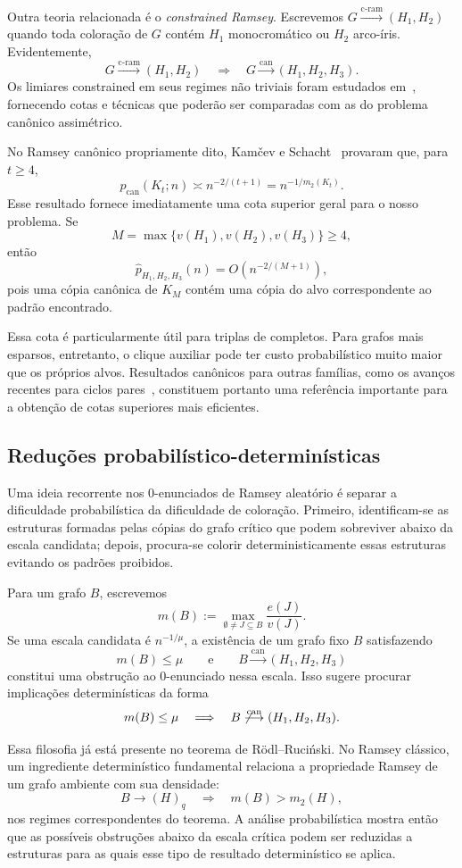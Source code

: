 \documentclass[11pt,a4paper]{article}
\newcommand{\can}{\stackrel{\mathrm{can}}{\longrightarrow}}
\newcommand{\cram}{\stackrel{\mathrm{c\text{-}ram}}{\longrightarrow}}
\theoremstyle{plain}
\theoremstyle{definition}
\begin{document}
Outra teoria relacionada é o \emph{constrained Ramsey}. Escrevemos
$G\cram(H_1,H_2)$
quando toda coloração de $G$ contém $H_1$ monocromático ou
$H_2$ arco-íris. Evidentemente,
\[
  G\cram(H_1,H_2)
  \quad\Longrightarrow\quad
  G\can(H_1,H_2,H_3).
\]
Os limiares constrained em seus regimes não triviais foram estudados
em~\cite{KKM,CKMM,BHHLM}, fornecendo cotas e técnicas que poderão ser
comparadas com as do problema canônico assimétrico.

No Ramsey canônico propriamente dito, Kamčev e Schacht~\cite{KS}
provaram que, para $t\ge4$,
\[
  p_{\mathrm{can}}(K_t;n)
  \asymp
  n^{-2/(t+1)}
  =
  n^{-1/m_2(K_t)}.
\]
Esse resultado fornece imediatamente uma cota superior geral para o
nosso problema. Se
\[
  M=\max\{v(H_1),v(H_2),v(H_3)\}\ge4,
\]
então
\[
  \widehat p_{H_1,H_2,H_3}(n)
  =
  O\!\left(n^{-2/(M+1)}\right),
\]
pois uma cópia canônica de $K_M$ contém uma cópia do alvo
correspondente ao padrão encontrado.

Essa cota é particularmente útil para triplas de completos. Para
grafos mais esparsos, entretanto, o clique auxiliar pode ter custo
probabilístico muito maior que os próprios alvos. Resultados canônicos
para outras famílias, como os avanços recentes para ciclos
pares~\cite{AKMM}, constituem portanto uma referência importante para
a obtenção de cotas superiores mais eficientes.


\subsection{Reduções probabilístico-determinísticas}
\label{sec:ponte}


Uma ideia recorrente nos $0$-enunciados de Ramsey aleatório é separar
a dificuldade probabilística da dificuldade de coloração. Primeiro,
identificam-se as estruturas formadas pelas cópias do grafo crítico
que podem sobreviver abaixo da escala candidata; depois, procura-se
colorir deterministicamente essas estruturas evitando os padrões
proibidos.

Para um grafo $B$, escrevemos
\[
  m(B)
  :=
  \max_{\emptyset\ne J\subseteq B}
  \frac{e(J)}{v(J)}.
\]
Se uma escala candidata é $n^{-1/\mu}$, a existência de um grafo
fixo $B$ satisfazendo
\[
  m(B)\le\mu
  \qquad\text{e}\qquad
  B\can(H_1,H_2,H_3)
\]
constitui uma obstrução ao $0$-enunciado nessa escala. Isso sugere
procurar implicações determinísticas da forma
\[
  m(B)\le\mu
  \quad\Longrightarrow\quad
  B\not\can(H_1,H_2,H_3).
\]

Essa filosofia já está presente no teorema de Rödl--Ruciński. No
Ramsey clássico, um ingrediente determinístico fundamental relaciona
a propriedade Ramsey de um grafo ambiente com sua densidade:
\[
  B\longrightarrow(H)_q
  \quad\Longrightarrow\quad
  m(B)>m_2(H),
\]
nos regimes correspondentes do teorema. A análise probabilística
mostra então que as possíveis obstruções abaixo da escala crítica
podem ser reduzidas a estruturas para as quais esse tipo de resultado
determinístico se aplica.
\end{document}
